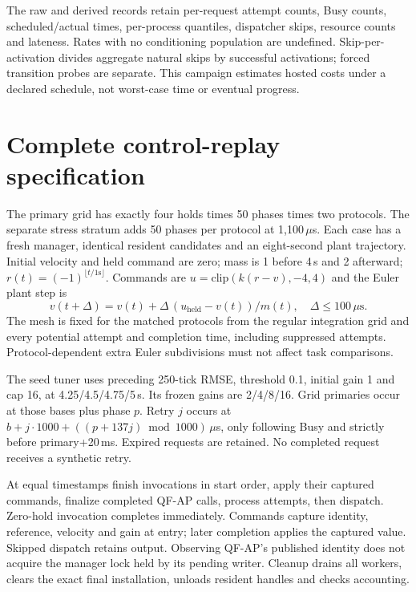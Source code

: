 

The raw and derived records retain per-request attempt counts, Busy counts, scheduled/actual times, per-process quantiles, dispatcher skips, resource counts and lateness. Rates with no conditioning population are undefined. Skip-per-activation divides aggregate natural skips by successful activations; forced transition probes are separate. This campaign estimates hosted costs under a declared schedule, not worst-case time or eventual progress.

\section{Complete control-replay specification}
\label{app:replay}
The primary grid has exactly four holds times 50 phases times two protocols. The separate stress stratum adds 50 phases per protocol at 1,100\,$\mu$s. Each case has a fresh manager, identical resident candidates and an eight-second plant trajectory. Initial velocity and held command are zero; mass is 1 before 4\,s and 2 afterward; $r(t)=(-1)^{\lfloor t/1\mathrm{s}\rfloor}$. Commands are $u=\mathrm{clip}(k(r-v),-4,4)$ and the Euler plant step is
\[
 v(t+\Delta)=v(t)+\Delta\,(u_{\mathrm{held}}-v(t))/m(t),\quad \Delta\leq100\,\mu\mathrm{s}.
\]
The mesh is fixed for the matched protocols from the regular integration grid and every potential attempt and completion time, including suppressed attempts. Protocol-dependent extra Euler subdivisions must not affect task comparisons.

The seed tuner uses preceding 250-tick RMSE, threshold 0.1, initial gain 1 and cap 16, at 4.25/4.5/4.75/5\,s. Its frozen gains are 2/4/8/16. Grid primaries occur at those bases plus phase $p$. Retry $j$ occurs at $b+j\cdot1000+((p+137j)\bmod1000)$\,$\mu$s, only following Busy and strictly before primary+20\,ms. Expired requests are retained. No completed request receives a synthetic retry.

At equal timestamps finish invocations in start order, apply their captured commands, finalize completed QF-AP calls, process attempts, then dispatch. Zero-hold invocation completes immediately. Commands capture identity, reference, velocity and gain at entry; later completion applies the captured value. Skipped dispatch retains output. Observing QF-AP's published identity does not acquire the manager lock held by its pending writer. Cleanup drains all workers, clears the exact final installation, unloads resident handles and checks accounting.

